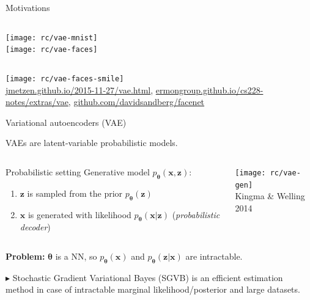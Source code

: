 \documentclass{beamer}
\begin{document}
  \begin{frame}{Motivations}

    \begin{columns}[T,onlytextwidth]
      \centering
      \texttt{[image: rc/vae-mnist]}\\

      \centering
      \texttt{[image: rc/vae-faces]}\\
    \end{columns}
    
    \centering
    \texttt{[image: rc/vae-faces-smile]}\\
    \tiny{\url{jmetzen.github.io/2015-11-27/vae.html}, \url{ermongroup.github.io/cs228-notes/extras/vae}, \url{github.com/davidsandberg/facenet}}

  \end{frame}

  \begin{frame}{Variational autoencoders (VAE)}


    VAEs are \alert{latent-variable probabilistic models}.
    
    \begin{columns}[T,onlytextwidth]

      \begin{block}{Probabilistic setting}
        Generative model $p_{\boldsymbol{\theta}}(\mathbf{x}, \mathbf{z})$:
        \begin{enumerate}
          \item $\mathbf{z}$ is sampled from the \alert{prior} $p_{\boldsymbol{\theta}}(\mathbf{z})$
          \item $\mathbf{x}$ is generated with \alert{likelihood} $p_{\boldsymbol{\theta}}(\mathbf{x}|\mathbf{z})$ (\emph{probabilistic decoder})
        \end{enumerate}
      \end{block}

      \centering
      \texttt{[image: rc/vae-gen]}\\
      \tiny{Kingma \& Welling 2014 \cite{Kingma2014}}
      
    \end{columns}
    \vspace{0.5cm}
    \textbf{Problem:} $\boldsymbol{\theta}$ is a NN, so $p_{\boldsymbol{\theta}}(\mathbf{x})$ and $p_{\boldsymbol{\theta}}(\mathbf{z}|\mathbf{x})$ are intractable.
    
    $\blacktriangleright$ Stochastic Gradient Variational Bayes (SGVB) \cite{Kingma2014} is an efficient estimation method in case of intractable marginal likelihood/posterior and large datasets.

  \end{frame}
\end{document}
